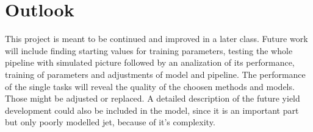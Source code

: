 \section{Outlook}\label{sec:outlook}

This project is meant to be continued and improved in a later class. Future work will include finding starting values for training parameters, testing the whole pipeline with simulated picture followed by an analization of its performance, training of parameters and
adjustments of model and pipeline. The performance of the single tasks will reveal the quality of the choosen methods and models. Those might be adjusted or replaced. A detailed description of the future yield development could also be included in the model, since it is an important part but only poorly modelled jet, because of it's complexity.
